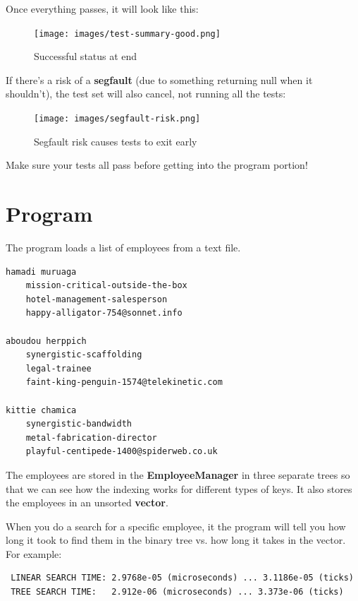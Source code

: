 \documentclass[a4paper,12pt,oneside]{book}
\begin{document}
    Once everything passes, it will look like this:
    
    \begin{figure}[h]
        \center
        \texttt{[image: images/test-summary-good.png]}
        \caption{Successful status at end}
    \end{figure}

    If there's a risk of a \textbf{segfault} (due to something returning
    null when it shouldn't), the test set will also cancel, not running all the tests:

    \begin{figure}[h]
        \center
        \texttt{[image: images/segfault-risk.png]}
        \caption{Segfault risk causes tests to exit early}
    \end{figure}
    
    Make sure your tests all pass before getting into the program portion!

    \section{Program}

    The program loads a list of employees from a text file.

    \begin{lstlisting}[style=textfile]
hamadi muruaga
	mission-critical-outside-the-box
	hotel-management-salesperson
	happy-alligator-754@sonnet.info

aboudou herppich
	synergistic-scaffolding
	legal-trainee
	faint-king-penguin-1574@telekinetic.com

kittie chamica
	synergistic-bandwidth
	metal-fabrication-director
	playful-centipede-1400@spiderweb.co.uk
    \end{lstlisting}

    The employees
    are stored in the \textbf{EmployeeManager} in three separate trees
    so that we can see how the indexing works for different types of keys.
    It also stores the employees in an unsorted \textbf{vector}.

    When you do a search for a specific employee, it the program will tell
    you how long it took to find them in the binary tree vs. how long
    it takes in the vector. For example:

    \begin{verbatim}
 LINEAR SEARCH TIME: 2.9768e-05 (microseconds) ... 3.1186e-05 (ticks)
 TREE SEARCH TIME:   2.912e-06 (microseconds) ... 3.373e-06 (ticks)
    \end{verbatim}
\end{document}
